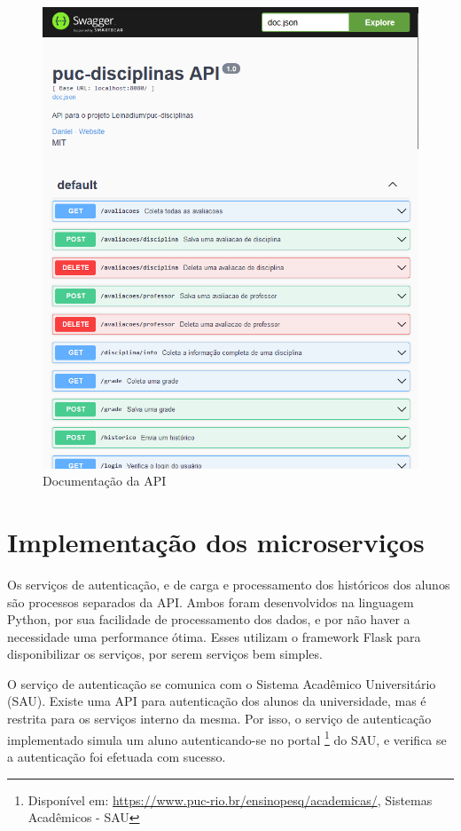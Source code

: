 \begin{figure}[ht]
    \begin{center}
    \includegraphics[width=360pt]{figuras/api.png}
    \caption{Documentação da API}
    \label{fig:api}
    \end{center}
\end{figure}

\section{Implementação dos microserviços}
\label{sec:Implementação dos microserviços}

Os serviços de autenticação, e de carga e processamento dos históricos dos alunos são processos separados da API. Ambos foram desenvolvidos na linguagem Python, por sua facilidade de processamento dos dados, e por não haver a necessidade uma performance ótima. Esses utilizam o framework Flask para disponibilizar os serviços, por serem serviços bem simples.

O serviço de autenticação se comunica com o Sistema Acadêmico Universitário (SAU). Existe uma API para autenticação dos alunos da universidade, mas é restrita para os serviços interno da mesma. Por isso, o serviço de autenticação implementado simula um aluno autenticando-se no portal \footnote{Disponível em: \url{https://www.puc-rio.br/ensinopesq/academicas/}, Sistemas Acadêmicos - SAU} do SAU, e verifica se a autenticação foi efetuada com sucesso.

